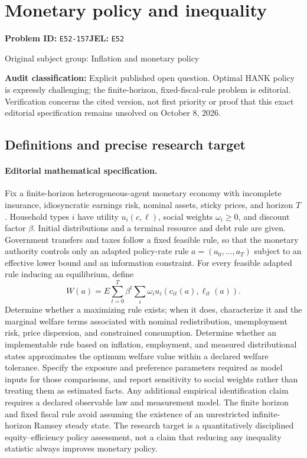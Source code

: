 \documentclass[11pt,a4paper]{article}
\begin{document}
\section*{Monetary policy and inequality}
\textbf{Problem ID:} \texttt{E52-157}\quad \textbf{JEL:} \texttt{E52}\par
\label{problem:OP-0249}
{\sffamily\small\color{muted}Original subject group: Inflation and monetary policy\par}
\label{definitions:problem:30007530}
\textbf{Audit classification:} Explicit published open question. Optimal HANK policy is expressly challenging; the finite-horizon, fixed-fiscal-rule problem is editorial. Verification concerns the cited version, not first priority or proof that this exact editorial specification remains unsolved on October 8, 2026.
\subsection*{Definitions and precise research target}
\paragraph{Editorial mathematical specification.} Fix a finite-horizon heterogeneous-agent monetary economy with incomplete insurance, idiosyncratic earnings risk, nominal assets, sticky prices, and horizon \(T\). Household types \(i\) have utility \(u_i(c,\ell)\), social weights \(\omega_i\ge0\), and discount factor \(\beta\). Initial distributions and a terminal resource and debt rule are given. Government transfers and taxes follow a fixed feasible rule, so that the monetary authority controls only an adapted policy-rate rule \(a=(a_0,\ldots,a_T)\) subject to an effective lower bound and an information constraint.
For every feasible adapted rule inducing an equilibrium, define
\[
W(a)=E\sum_{t=0}^T\beta^t\sum_i\omega_i u_i(c_{it}(a),\ell_{it}(a)).
\]
Determine whether a maximizing rule exists; when it does, characterize it and the marginal welfare terms associated with nominal redistribution, unemployment risk, price dispersion, and constrained consumption. Determine whether an implementable rule based on inflation, employment, and measured distributional states approximates the optimum welfare value within a declared welfare tolerance. Specify the exposure and preference parameters required as model inputs for those comparisons, and report sensitivity to social weights rather than treating them as estimated facts. Any additional empirical identification claim requires a declared observable law and measurement model. The finite horizon and fixed fiscal rule avoid assuming the existence of an unrestricted infinite-horizon Ramsey steady state. The research target is a quantitatively disciplined equity–efficiency policy assessment, not a claim that reducing any inequality statistic always improves monetary policy.
\end{document}

